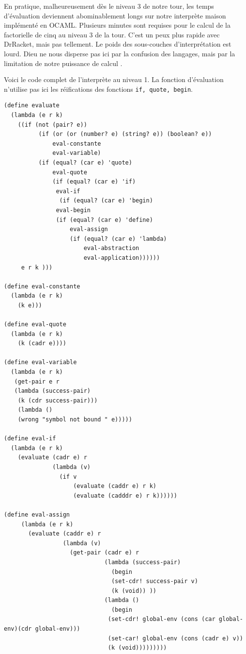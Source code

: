 \documentclass[11pt]{book}
\begin{document}
\vspace{0.3cm}
En pratique, malheureusement dès le niveau 3 de notre tour, les temps d'évaluation deviennent abominablement longs sur 
notre interprète  maison implémenté en OCAML.
Plusieurs minutes sont requises pour le calcul de la factorielle de cinq au niveau 3 de la tour.
C'est un peux plus rapide avec DrRacket, mais pas tellement. Le poids des sous-couches d'interprétation est lourd.
Dieu ne nous disperse pas ici par la confusion des langages, mais par la limitation de notre puissance de calcul \Laughey .


Voici le code complet de l'interprète au niveau 1. La fonction d'évaluation n'utilise pas ici
les réifications des fonctions \verb+if, quote, begin+.

\begin{footnotesize}
\begin{Verbatim}
(define evaluate
  (lambda (e r k)
    ((if (not (pair? e))
          (if (or (or (number? e) (string? e)) (boolean? e))
              eval-constante
              eval-variable)
          (if (equal? (car e) 'quote)
              eval-quote
              (if (equal? (car e) 'if)
               eval-if
                (if (equal? (car e) 'begin)
               eval-begin
               (if (equal? (car e) 'define)
                   eval-assign
                   (if (equal? (car e) 'lambda)
                       eval-abstraction
                       eval-application))))))
     e r k )))

(define eval-constante
  (lambda (e r k)
    (k e)))

(define eval-quote
  (lambda (e r k)
    (k (cadr e))))

(define eval-variable
  (lambda (e r k)
   (get-pair e r
   (lambda (success-pair)
    (k (cdr success-pair)))
    (lambda ()
    (wrong "symbol not bound " e)))))

(define eval-if
  (lambda (e r k)
    (evaluate (cadr e) r
              (lambda (v)
                (if v
                    (evaluate (caddr e) r k)
                    (evaluate (cadddr e) r k))))))

(define eval-assign
     (lambda (e r k)
       (evaluate (caddr e) r
                 (lambda (v)
                   (get-pair (cadr e) r
                             (lambda (success-pair)
                               (begin
                               (set-cdr! success-pair v)
                               (k (void)) ))
                             (lambda ()
                               (begin
                              (set-cdr! global-env (cons (car global-env)(cdr global-env)))
                              (set-car! global-env (cons (cadr e) v))
                              (k (void)))))))))


\end{Verbatim}
\end{footnotesize}
\end{document}
